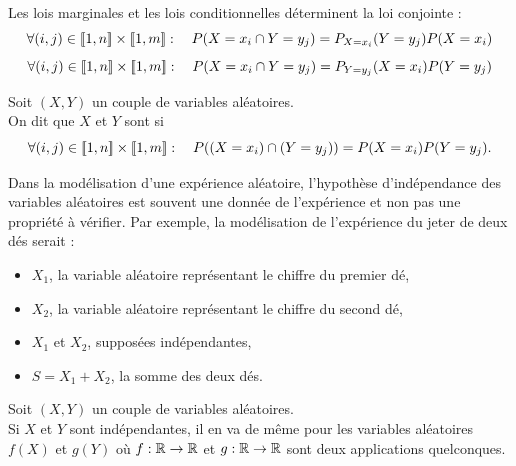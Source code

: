 \documentclass{book}
\begin{document}
\begin{Remarque}
Les lois marginales et les lois conditionnelles déterminent la loi conjointe :
$$\forall (i,j)\in  \mathopen\lbrack\!\lbrack1,n \mathclose\rbrack\!\rbrack\times \mathopen\lbrack\!\lbrack1,m \mathclose\rbrack\!\rbrack:\quad P(X=x_i\cap Y=y_j)=P_{X=x_i}(Y=y_j)P(X=x_i)$$
$$\forall (i,j)\in  \mathopen\lbrack\!\lbrack1,n \mathclose\rbrack\!\rbrack\times \mathopen\lbrack\!\lbrack1,m \mathclose\rbrack\!\rbrack:\quad P(X=x_i\cap Y=y_j)=P_{Y=y_j}(X=x_i)P(Y=y_j)$$
\end{Remarque}
\begin{Definition}[Indépendance]
Soit $(X,Y)$ un couple de variables aléatoires.\\
On dit que $X$ et $Y$ sont  si 
$$ \forall (i,j)\in  \mathopen\lbrack\!\lbrack1,n \mathclose\rbrack\!\rbrack\times \mathopen\lbrack\!\lbrack1,m \mathclose\rbrack\!\rbrack:\quad P( (X=x_i)\cap (Y=y_j) ) = P(X=x_i) P(Y=y_j).$$
\end{Definition}
\begin{Remarque} Dans la modélisation d'une expérience aléatoire, l'hypothèse d'indépendance des variables aléatoires est souvent une donnée de l'expérience et 
non pas une propriété à vérifier. Par exemple, la modélisation de l'expérience du jeter de deux dés serait :
\begin{itemize}
\item $X_1$,  la variable aléatoire représentant le chiffre du premier dé,
\item $X_2$, la variable aléatoire représentant le chiffre du second dé,
\item $X_1$ et $X_2$, supposées indépendantes,
\item $S=X_1+X_2$, la somme des deux dés.
\end{itemize}
\end{Remarque}
\begin{Theoreme}
Soit $(X,Y)$ un couple de variables aléatoires.\\
Si $X$ et $Y$ sont indépendantes, il en va de même pour les variables aléatoires $f(X)$ et $g(Y)$
où $f:\mathbb{R}\to \mathbb{R}$ et $g:\mathbb{R}\to \mathbb{R} $ sont deux applications quelconques.
\end{Theoreme}




\end{document}
